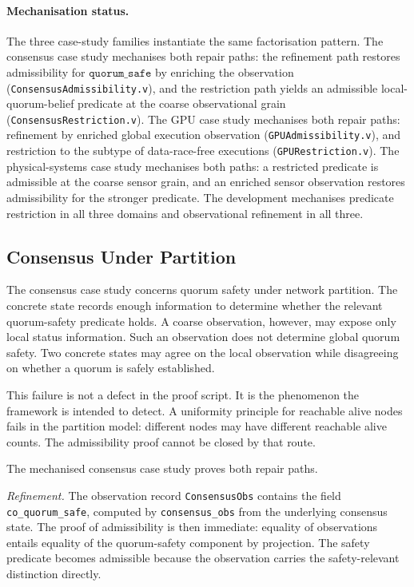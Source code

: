 \paragraph{Mechanisation status.}
The three case-study families instantiate the same factorisation pattern.
The consensus case study mechanises both repair paths: the refinement
path restores admissibility for \(\texttt{quorum\_safe}\) by enriching
the observation (\texttt{ConsensusAdmissibility.v}), and the restriction
path yields an admissible local-quorum-belief predicate at the coarse
observational grain (\texttt{ConsensusRestriction.v}). The GPU case study
mechanises both repair paths: refinement by enriched global execution
observation (\texttt{GPUAdmissibility.v}), and restriction to the subtype
of data-race-free executions (\texttt{GPURestriction.v}). The
physical-systems case study mechanises both paths: a restricted predicate
is admissible at the coarse sensor grain, and an enriched sensor observation
restores admissibility for the stronger predicate. The development
mechanises predicate restriction in all three domains and observational
refinement in all three.

\subsection{Consensus Under Partition}

The consensus case study concerns quorum safety under network partition. The
concrete state records enough information to determine whether the relevant
quorum-safety predicate holds. A coarse observation, however, may expose only
local status information. Such an observation does not determine global quorum
safety. Two concrete states may agree on the local observation while disagreeing
on whether a quorum is safely established.

This failure is not a defect in the proof script. It is the phenomenon the
framework is intended to detect. A uniformity principle for reachable alive
nodes fails in the partition model: different nodes may have different
reachable alive counts. The admissibility proof cannot be closed by that
route.

The mechanised consensus case study proves both repair paths.

\textit{Refinement.} The observation record \texttt{ConsensusObs} contains the
field \texttt{co\_quorum\_safe}, computed by \texttt{consensus\_obs} from the
underlying consensus state. The proof of admissibility is then immediate:
equality of observations entails equality of the quorum-safety component by
projection. The safety predicate becomes admissible because the observation
carries the safety-relevant distinction directly.

